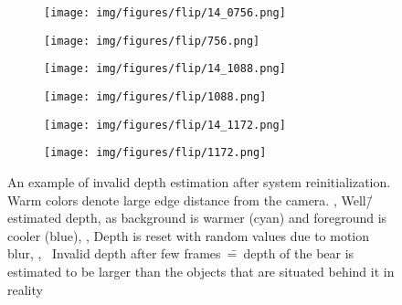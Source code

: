 \begin{figure}[hp]
	\centering
	\begin{subfigure}{0.4\textwidth}
		\centering
		\centering\texttt{[image: img/figures/flip/14\_0756.png]}
		\subcaption{\label{fig:teddyfirst}}
	\end{subfigure}
	\begin{subfigure}{0.4\textwidth}
		\centering
		\centering\texttt{[image: img/figures/flip/756.png]}
		\subcaption{\label{fig:teddyfirst1}}
	\end{subfigure}
	\begin{subfigure}{0.4\textwidth}
		\centering
		\centering\texttt{[image: img/figures/flip/14\_1088.png]}
		\subcaption{\label{fig:teddybefore}}
	\end{subfigure}
	\begin{subfigure}{0.4\textwidth}
		\centering
		\centering\texttt{[image: img/figures/flip/1088.png]}
		\subcaption{\label{fig:teddybefore1}}
	\end{subfigure}
	\begin{subfigure}{0.4\textwidth}
		\centering
		\centering\texttt{[image: img/figures/flip/14\_1172.png]}
		\subcaption{\label{fig:teddylast}}
	\end{subfigure}
	\begin{subfigure}{0.4\textwidth}
		\centering
		\centering\texttt{[image: img/figures/flip/1172.png]}
		\subcaption{\label{fig:teddylast1}}
	\end{subfigure}
	\caption{\label{fig:teddyflip} An example of invalid depth estimation after system reinitialization. Warm colors denote large edge distance from the camera. \protect{}, \protect{} Well\=/estimated depth, as background is warmer (cyan) and foreground is cooler (blue), \protect{}, \protect{} Depth is reset with random values due to motion blur,
		\protect{},~\protect{} Invalid depth after few frames~\==~depth of the bear is estimated to be larger than the objects that are situated behind it in reality}
\end{figure}

